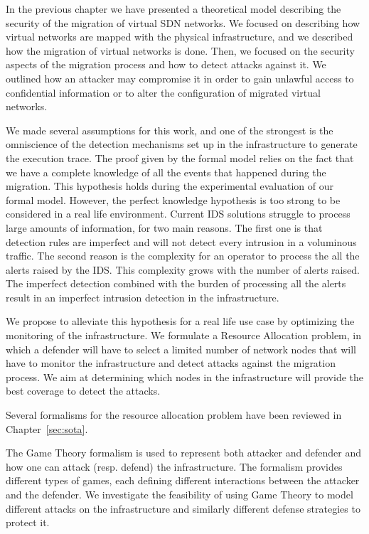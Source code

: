 In the previous chapter we have presented a theoretical model describing the security of the migration of virtual SDN networks. We focused on describing how virtual networks are mapped with the physical infrastructure, and we described how the migration of virtual networks is done. Then, we focused on the security aspects of the migration process and how to detect attacks against it. We outlined how an attacker may compromise it in order to gain unlawful access to confidential information or to alter the configuration of migrated virtual networks.

We made several assumptions for this work, and one of the strongest is the omniscience of the detection mechanisms set up in the infrastructure to generate the execution trace. The proof given by the formal model relies on the fact that we have a complete knowledge of all the events that happened during the migration.  This hypothesis holds during the experimental evaluation of our formal model. 
However, the perfect knowledge hypothesis is too strong to be considered in a real life environment. 
Current IDS solutions struggle to process large amounts of information, for two main reasons. The first one is that detection rules are imperfect and will not detect every intrusion in a voluminous traffic. The second reason is the complexity for an operator to process the all the alerts raised by the IDS. This complexity grows with the number of alerts raised. The imperfect detection combined with the burden of processing all the alerts result in an imperfect intrusion detection in the infrastructure.

We propose to alleviate this hypothesis for a real life use case by optimizing the monitoring of the infrastructure. We formulate a Resource Allocation problem, in which a defender will have to select a limited number of network nodes that will have to monitor the infrastructure and detect attacks against the migration process. We aim at determining which nodes in the infrastructure will provide the best coverage to detect the attacks. 

Several formalisms for the resource allocation problem have been reviewed in Chapter~\ref{sec:sota}.

The Game Theory formalism is used to represent both attacker and defender and how one can attack (resp. defend) the infrastructure.
The formalism provides different types of games, each defining different interactions between the attacker and the defender.
We investigate the feasibility of using Game Theory to model different attacks on the infrastructure and similarly different defense strategies to protect it.

